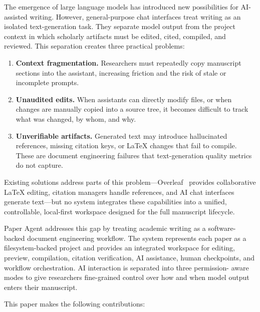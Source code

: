 \documentclass[11pt,a4paper]{article}
\newcommand{\software}{Paper Agent}
\begin{document}
The emergence of large language models has introduced new possibilities for AI-
assisted writing. However, general-purpose chat interfaces treat writing as an
isolated text-generation task. They separate model output from the project
context in which scholarly artifacts must be edited, cited, compiled, and
reviewed. This separation creates three practical problems:

\begin{enumerate}
  \item \textbf{Context fragmentation.} Researchers must repeatedly copy
  manuscript sections into the assistant, increasing friction and the risk of
  stale or incomplete prompts.

  \item \textbf{Unaudited edits.} When assistants can directly modify files, or
  when changes are manually copied into a source tree, it becomes difficult to
  track what was changed, by whom, and why.

  \item \textbf{Unverifiable artifacts.} Generated text may introduce
  hallucinated references, missing citation keys, or \LaTeX{} changes that fail
  to compile. These are document engineering failures that text-generation
  quality metrics do not capture.
\end{enumerate}

Existing solutions address parts of this problem---Overleaf~\cite{overleaf}
provides collaborative \LaTeX{} editing, citation managers handle references,
and AI chat interfaces generate text---but no system integrates these
capabilities into a unified, controllable, local-first workspace designed for
the full manuscript lifecycle.

\software{} addresses this gap by treating academic writing as a software-
backed document engineering workflow. The system represents each paper as a
filesystem-backed project and provides an integrated workspace for editing,
preview, compilation, citation verification, AI assistance, human checkpoints,
and workflow orchestration. AI interaction is separated into three permission-
aware modes to give researchers fine-grained control over how and when model
output enters their manuscript.

This paper makes the following contributions:
\end{document}
